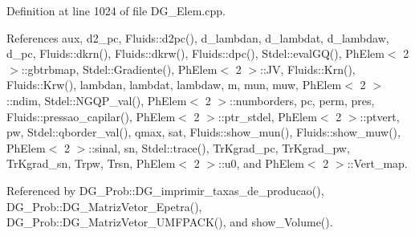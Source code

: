 Definition at line 1024 of file D\+G\+\_\+\+Elem.\+cpp.



References aux, d2\+\_\+pc, Fluids\+::d2pc(), d\+\_\+lambdan, d\+\_\+lambdat, d\+\_\+lambdaw, d\+\_\+pc, Fluids\+::dkrn(), Fluids\+::dkrw(), Fluids\+::dpc(), Stdel\+::eval\+G\+Q(), Ph\+Elem$<$ 2 $>$\+::gbtrbmap, Stdel\+::\+Gradiente(), Ph\+Elem$<$ 2 $>$\+::\+JV, Fluids\+::\+Krn(), Fluids\+::\+Krw(), lambdan, lambdat, lambdaw, m, mun, muw, Ph\+Elem$<$ 2 $>$\+::ndim, Stdel\+::\+N\+G\+Q\+P\+\_\+val(), Ph\+Elem$<$ 2 $>$\+::numborders, pc, perm, pres, Fluids\+::pressao\+\_\+capilar(), Ph\+Elem$<$ 2 $>$\+::ptr\+\_\+stdel, Ph\+Elem$<$ 2 $>$\+::ptvert, pw, Stdel\+::qborder\+\_\+val(), qmax, sat, Fluids\+::show\+\_\+mun(), Fluids\+::show\+\_\+muw(), Ph\+Elem$<$ 2 $>$\+::sinal, sn, Stdel\+::trace(), Tr\+Kgrad\+\_\+pc, Tr\+Kgrad\+\_\+pw, Tr\+Kgrad\+\_\+sn, Trpw, Trsn, Ph\+Elem$<$ 2 $>$\+::u0, and Ph\+Elem$<$ 2 $>$\+::\+Vert\+\_\+map.



Referenced by D\+G\+\_\+\+Prob\+::\+D\+G\+\_\+imprimir\+\_\+taxas\+\_\+de\+\_\+producao(), D\+G\+\_\+\+Prob\+::\+D\+G\+\_\+\+Matriz\+Vetor\+\_\+\+Epetra(), D\+G\+\_\+\+Prob\+::\+D\+G\+\_\+\+Matriz\+Vetor\+\_\+\+U\+M\+F\+P\+A\+C\+K(), and show\+\_\+\+Volume().

